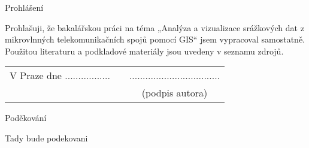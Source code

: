 \newcommand{\odsaditodzhora}{\hskip1pt\vfill}

\odsaditodzhora
\noindent Prohlášení

Prohlašuji, že bakalářskou práci na téma „Analýza a vizualizace srážkových dat z mikrovlnných telekomunikačních spojů pomocí GIS“ jsem vypracoval samostatně. Použitou
literaturu a podkladové materiály jsou uvedeny v seznamu
zdrojů.

\begin{flushleft}
\begin{tabular}{cp{}c}
V Praze dne .................
& 
&
..................................
\\
&&
(podpis autora)
\end{tabular}

\end{flushleft}
\newpage

\odsaditodzhora
\noindent Poděkování

Tady bude podekovani

\newpage
